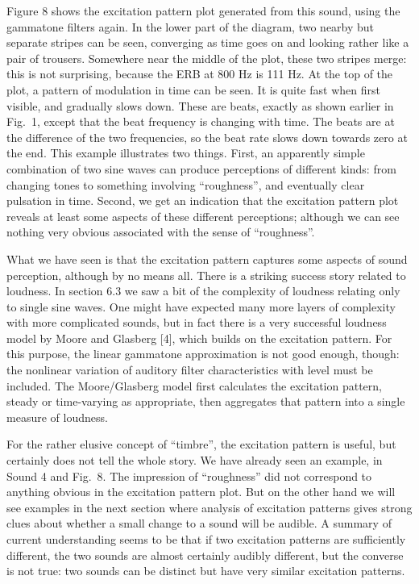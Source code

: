   Figure 8 shows the excitation pattern plot generated from this sound, using 
  the gammatone filters again. In the lower part of the diagram, two nearby but 
  separate stripes can be seen, converging as time goes on and looking rather 
  like a pair of trousers. Somewhere near the middle of the plot, these two 
  stripes merge: this is not surprising, because the ERB at 800 Hz is 111 Hz. 
  At the top of the plot, a pattern of modulation in time can be seen. It is 
  quite fast when first visible, and gradually slows down. These are beats, 
  exactly as shown earlier in Fig.\ 1, except that the beat frequency is 
  changing with time. The beats are at the difference of the two frequencies, 
  so the beat rate slows down towards zero at the end. This example illustrates 
  two things. First, an apparently simple combination of two sine waves can 
  produce perceptions of different kinds: from changing tones to something 
  involving ``roughness'', and eventually clear pulsation in time. Second, we 
  get an indication that the excitation pattern plot reveals at least some 
  aspects of these different perceptions; although we can see nothing very 
  obvious associated with the sense of ``roughness''. 


  What we have seen is that the excitation pattern captures some aspects of 
  sound perception, although by no means all. There is a striking success story 
  related to loudness. In section 6.3 we saw a bit of the complexity of 
  loudness relating only to single sine waves. One might have expected many 
  more layers of complexity with more complicated sounds, but in fact there is 
  a very successful loudness model by Moore and Glasberg [4], which builds on 
  the excitation pattern. For this purpose, the linear gammatone approximation 
  is not good enough, though: the nonlinear variation of auditory filter 
  characteristics with level must be included. The Moore/Glasberg model first 
  calculates the excitation pattern, steady or time-varying as appropriate, 
  then aggregates that pattern into a single measure of loudness. 

  For the rather elusive concept of ``timbre'', the excitation pattern is 
  useful, but certainly does not tell the whole story. We have already seen an 
  example, in Sound 4 and Fig.\ 8. The impression of ``roughness'' did not 
  correspond to anything obvious in the excitation pattern plot. But on the 
  other hand we will see examples in the next section where analysis of 
  excitation patterns gives strong clues about whether a small change to a 
  sound will be audible. A summary of current understanding seems to be that if 
  two excitation patterns are sufficiently different, the two sounds are almost 
  certainly audibly different, but the converse is not true: two sounds can be 
  distinct but have very similar excitation patterns. 

